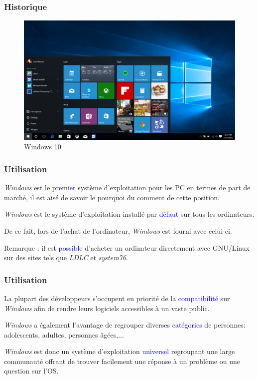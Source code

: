 \documentclass[aspectratio=169]{beamer}
\begin{document}
\begin{frame}
  \frametitle{Historique}
  \begin{figure}[!h]
    \center
    \includegraphics[scale=0.18]
    {textures/images/windows/historic/Win10.png}
    \caption{Windows 10}
  \end{figure}
\end{frame}

\begin{frame}
  \frametitle{Utilisation}
  \textit{Windows} est le \textcolor{blue}{premier} système d'exploitation pour les PC
  en termes de part de marché, il est aisé de savoir le pourquoi du comment de
  cette position.

  \hspace{0.5cm}

    \textit{Windows} est le système d'exploitation installé par \textcolor{blue}{défaut}
    sur tous les ordinateurs.

    \hspace{0.5cm}

    De ce fait, lors de l'achat de l'ordinateur, \textit{Windows} est fourni avec
    celui-ci.

    \hspace{0.5cm}

    Remarque : il est \textcolor{blue}{possible} d'acheter un ordinateur
    directement avec GNU/Linux sur des sites tels que \textit{LDLC} et
    \textit{system76}.
\end{frame}

\begin{frame}
  \frametitle{Utilisation}
  La plupart des développeurs s'occupent en priorité de la
  \textcolor{blue}{compatibilité} sur \textit{Windows} afin de rendre leurs logiciels
  accessibles à un vaste public.

  \hspace{0.5cm}

  \textit{Windows} a également l'avantage de regrouper diverses
  \textcolor{blue}{catégories} de personnes: adolescents, adultes, personnes
  âgées,...

  \hspace{0.5cm}

  \textit{Windows} est donc un système d'exploitation \textcolor{blue}{universel}
  regroupant une large communauté offrant de trouver facilement une réponse à un
  problème ou une question sur l'OS.
\end{frame}
\end{document}
